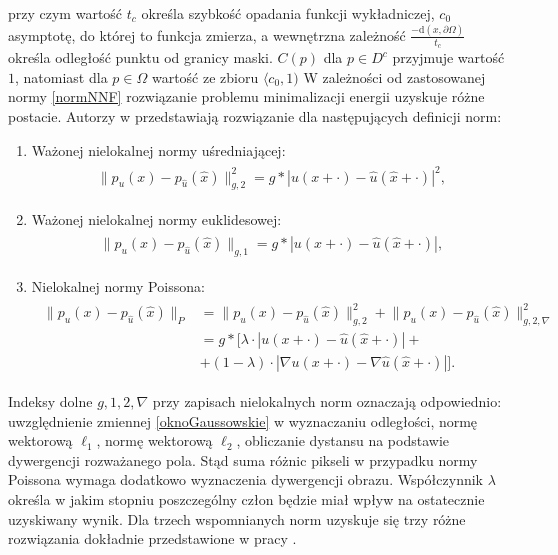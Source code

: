 \documentclass[a4paper,12pt,twoside,openany]{report}
\begin{document}
przy czym wartość $t_c$ określa szybkość opadania funkcji wykładniczej, $c_0$ asymptotę, do której to funkcja zmierza, a wewnętrzna zależność $\frac{-\mathrm{d}(x,\partial\Omega)}{t_c}$ określa odległość punktu od granicy maski. $C(p)$ dla $p \in D^c$ przyjmuje wartość $1$, natomiast dla $p \in \Omega$ wartość ze zbioru $\langle c_0,1)$ W zależności od zastosowanej normy \eqref{normNNF} rozwiązanie problemu minimalizacji energii uzyskuje różne postacie. Autorzy w \cite{arias2011variational} przedstawiają rozwiązanie dla następujących definicji norm:
\begin{enumerate}
\item
Ważonej nielokalnej normy uśredniającej:
\begin{align}
\begin{aligned}
\big\| p_{u}(x) - p_{\hat{u}}(\hat{x}) \big\|^{2}_{g,2} = g \ast | u(x+\cdot) - \hat{u}(\hat{x}+\cdot) |^2,
\label{nonLocalMeans}
\end{aligned}
\end{align}
\item
Ważonej nielokalnej normy euklidesowej:
\begin{align}
\begin{aligned}
\big\| p_{u}(x) - p_{\hat{u}}(\hat{x}) \big\|_{g,1} = g \ast | u(x+\cdot) - \hat{u}(\hat{x}+\cdot)|,
\label{nonLocalMedians}
\end{aligned}
\end{align}
\item
Nielokalnej normy Poissona:
\begin{align}
\begin{aligned}
\big\| p_{u}(x) - p_{\hat{u}}(\hat{x}) \big\|_{P} &= \big\| p_{u}(x) - p_{\hat{u}}(\hat{x}) \big\|^{2}_{g,2} + \big\| p_{u}(x) - p_{\hat{u}}(\hat{x}) \big\|^{2}_{g,2,\nabla} \\
&= g \ast \Big[\lambda \cdot | u(x+\cdot) - \hat{u}(\hat{x}+\cdot) | + \\
&+ (1-\lambda)\cdot |\nabla u(x+\cdot) - \nabla \hat{u}(\hat{x}+\cdot)|\Big].
\label{nonLocalpoisson}
\end{aligned}
\end{align}
\end{enumerate}
Indeksy dolne $g, 1, 2, \nabla$ przy zapisach nielokalnych norm oznaczają odpowiednio: uwzględnienie zmiennej \eqref{oknoGaussowskie} w wyznaczaniu odległości, normę wektorową $\ell_{1}$, normę wektorową $\ell_{2}$, obliczanie dystansu na podstawie dywergencji rozważanego pola. Stąd suma różnic pikseli w przypadku normy Poissona wymaga dodatkowo wyznaczenia dywergencji obrazu. Współczynnik $\lambda$ określa w jakim stopniu poszczególny człon będzie miał wpływ na ostatecznie uzyskiwany wynik. Dla trzech wspomnianych norm uzyskuje się trzy różne rozwiązania dokładnie przedstawione w pracy \cite{arias2011variational}.
\end{document}
